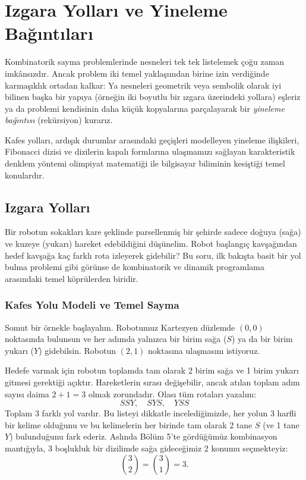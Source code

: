 \chapter[Izgara Yolları ve Yineleme Bağıntıları · \textit{İleri}]{Izgara Yolları ve Yineleme Bağıntıları}

Kombinatorik sayma problemlerinde nesneleri tek tek listelemek çoğu zaman imkânsızdır. Ancak problem iki temel yaklaşımdan birine izin verdiğinde karmaşıklık ortadan kalkar: Ya nesneleri geometrik veya sembolik olarak iyi bilinen başka bir yapıya (örneğin iki boyutlu bir ızgara üzerindeki yollara) eşleriz ya da problemi kendisinin daha küçük kopyalarına parçalayarak bir \emph{yineleme bağıntısı} (rekürsiyon) kurarız. 

Kafes yolları, ardışık durumlar arasındaki geçişleri modelleyen yineleme ilişkileri, Fibonacci dizisi ve dizilerin kapalı formlarına ulaşmamızı sağlayan karakteristik denklem yöntemi olimpiyat matematiği ile bilgisayar biliminin kesiştiği temel konulardır.

\section{Izgara Yolları}

Bir robotun sokakları kare şeklinde parsellenmiş bir şehirde sadece doğuya (sağa) ve kuzeye (yukarı) hareket edebildiğini düşünelim. Robot başlangıç kavşağından hedef kavşağa kaç farklı rota izleyerek gidebilir? Bu soru, ilk bakışta basit bir yol bulma problemi gibi görünse de kombinatorik ve dinamik programlama arasındaki temel köprülerden biridir.

\subsection{Kafes Yolu Modeli ve Temel Sayma}

Somut bir örnekle başlayalım. Robotumuz Kartezyen düzlemde $(0,0)$ noktasında bulunsun ve her adımda yalnızca bir birim sağa ($S$) ya da bir birim yukarı ($Y$) gidebilsin. Robotun $(2,1)$ noktasına ulaşmasını istiyoruz.

Hedefe varmak için robotun toplamda tam olarak 2 birim sağa ve 1 birim yukarı gitmesi gerektiği açıktır. Hareketlerin sırası değişebilir, ancak atılan toplam adım sayısı daima $2 + 1 = 3$ olmak zorundadır. Olası tüm rotaları yazalım:
\[
SSY, \quad SYS, \quad YSS
\]
Toplam 3 farklı yol vardır. Bu listeyi dikkatle incelediğimizde, her yolun 3 harfli bir kelime olduğunu ve bu kelimelerin her birinde tam olarak 2 tane $S$ (ve 1 tane $Y$) bulunduğunu fark ederiz. Aslında Bölüm 5'te gördüğümüz kombinasyon mantığıyla, 3 boşlukluk bir dizilimde sağa gideceğimiz 2 konumu seçmekteyiz:
\[
\binom{3}{2} = \binom{3}{1} = 3.
\]

